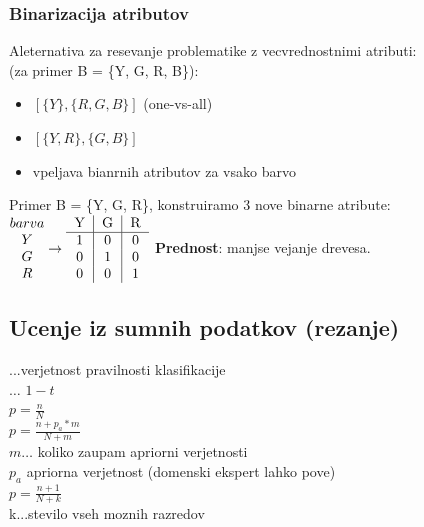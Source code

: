 \subsubsection{Binarizacija atributov}
Aleternativa za resevanje problematike z vecvrednostnimi atributi:\\
 (za primer B = \{Y, G, R, B\}):
\begin{itemize}[leftmargin=*,topsep=0pt,noitemsep]
    \item $\left[\{Y \}, \{R, G, B \} \right]$ (one-vs-all)
    \item $\left[\{Y, R\}, \{G, B\}\right]$ 
    \item vpeljava bianrnih atributov za vsako barvo
\end{itemize}
Primer B = \{Y, G, R\}, konstruiramo 3 nove binarne atribute:
$ \begin{matrix} barva \\ Y \\ G \\ R \end{matrix} \rightarrow \begin{tabular}{c|c|c} Y & G & R \\ \hline 1 & 0 & 0 \\ 0 & 1 & 0 \\ 0 & 0 & 1\end{tabular}$
\textbf{Prednost}: manjse vejanje drevesa.


\subsection{Ucenje iz sumnih podatkov (rezanje)}
...verjetnost pravilnosti klasifikacije\\
 $\dots$ $1-t$\\
 $p=\frac{n}{N}$\\
 $p=\frac{n + p_a * m}{N+m}$\\
$m \dots$ koliko zaupam apriorni verjetnosti\\
$p_a$ apriorna verjetnost (domenski ekspert lahko pove)\\
 $p=\frac{n+1}{N+k}$\\
k...stevilo vseh moznih razredov

